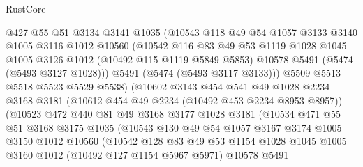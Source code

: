 \begin{lexlean}{RustCore}
\begin{coremodule}
                  @427
                  @55
                  @51
                  @3134
                  @3141
                  @1035
                  (@10543
                    @118
                    @49
                    @54
                    @1057
                    @3133
                    @3140
                    @1005
                    @3116
                    @1012
                    @10560
                    (@10542
                      @116
                      @83
                      @49
                      @53
                      @1119
                      @1028
                      @1045
                      @1005
                      @3126
                      @1012
                      (@10492 @115 @1119 @5849 @5853)
                      @10578
                      @5491
                      (@5474 (@5493 @3127 @1028)))
                    @5491
                    (@5474 (@5493 @3117 @3133)))
                  @5509
                  @5513
                  @5518
                  @5523
                  @5529
                  @5538)
                (@10602
                  @3143
                  @454
                  @541
                  @49
                  @1028
                  @2234
                  @3168
                  @3181
                  (@10612 @454 @49 @2234 (@10492 @453 @2234 @8953 @8957))
                  (@10523
                    @472
                    @440
                    @81
                    @49
                    @3168
                    @3177
                    @1028
                    @3181
                    (@10534
                      @471
                      @55
                      @51
                      @3168
                      @3175
                      @1035
                      (@10543
                        @130
                        @49
                        @54
                        @1057
                        @3167
                        @3174
                        @1005
                        @3150
                        @1012
                        @10560
                        (@10542
                          @128
                          @83
                          @49
                          @53
                          @1154
                          @1028
                          @1045
                          @1005
                          @3160
                          @1012
                          (@10492 @127 @1154 @5967 @5971)
                          @10578
                          @5491

\end{coremodule}
\end{lexlean}
